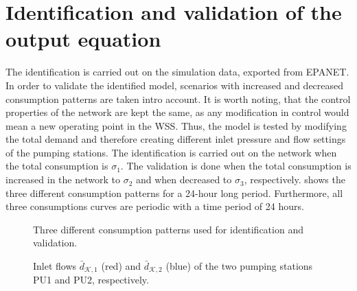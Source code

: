 \section{Identification and validation of the output equation}
\label{identification_and_validation_of_the_output_eq} 

The identification is carried out on the simulation data, exported from EPANET. In order to validate the identified model, scenarios with increased and decreased consumption patterns are taken intro account. It is worth noting, that the control properties of the network are kept the same, as any modification in control would mean a new operating point in the WSS. Thus, the model is tested by modifying the total demand and therefore creating different inlet pressure and flow settings of the pumping stations. The identification is carried out on the network when the total consumption is $\sigma_1$. The validation is done when the total consumption is increased in the network to $\sigma_2$ and when decreased to $\sigma_3$, respectively.  shows the three different consumption patterns for a 24-hour long period. Furthermore, all three consumptions curves are periodic with a time period of 24 hours. 

 \begin{figure}[h!]
 \centering
  
 \caption{Three different consumption patterns used for identification and validation.}
 \label{fig:sigma123}
 \end{figure}

 \begin{figure}[h!]
 \centering
  
 \label{fig:inlet_flows_example1}
 \end{figure}

\vspace{-8mm}

 \begin{figure}[h!]
 \centering
 \hspace{0.15mm}
  
 \vspace{-1.5mm}
 \caption{Inlet flows $\bar{d}_{\mathcal{K},1}$ (red) and $\bar{d}_{\mathcal{K},2}$ (blue) of the two pumping stations PU1 and PU2, respectively.}
 \label{fig:inlet_flows_example1}
 \end{figure}

